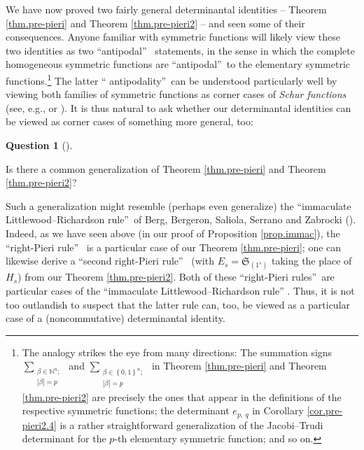 \documentclass
[numbers=enddot,12pt,final,onecolumn,notitlepage,english]{scrartcl}%
\theoremstyle{definition}
\newtheorem{quest}[theo]{Question}
\newenvironment{question}[1][]
{\begin{quest}[#1]\begin{leftbar}}
{\end{leftbar}\end{quest}}
\newenvironment{question}[1][Question]{\noindent\textbf{#1.} }{\ \rule{0.5em}{0.5em}}
\let\sumnonlimits\sum
\renewcommand{\sum}{\sumnonlimits\limits}
\begin{document}
We have now proved two fairly general determinantal identities -- Theorem
\ref{thm.pre-pieri} and Theorem \ref{thm.pre-pieri2} -- and seen some of their
consequences. Anyone familiar with symmetric functions will likely view these
two identities as two \textquotedblleft antipodal\textquotedblright%
\ statements, in the sense in which the complete homogeneous symmetric
functions are \textquotedblleft antipodal\textquotedblright\ to the elementary
symmetric functions.\footnote{The analogy strikes the eye from many
directions: The summation signs $\sum_{\substack{\beta\in\mathbb{N}%
^{n};\\\left\vert \beta\right\vert =p}}$ and $\sum_{\substack{\beta\in\left\{
0,1\right\}  ^{n};\\\left\vert \beta\right\vert =p}}$ in Theorem
\ref{thm.pre-pieri} and Theorem \ref{thm.pre-pieri2} are precisely the ones
that appear in the definitions of the respective symmetric functions; the
determinant $e_{p,\ q}$ in Corollary \ref{cor.pre-pieri2.4} is a rather
straightforward generalization of the Jacobi--Trudi determinant for the $p$-th
elementary symmetric function; and so on.} The latter \textquotedblleft
antipodality\textquotedblright\ can be understood particularly well by viewing
both families of symmetric functions as corner cases of \emph{Schur functions}
(see, e.g., \cite[Chapter 7]{Stanley-EC2} or \cite[\S I.3]{Macdon95}). It is
thus natural to ask whether our determinantal identities can be viewed as
corner cases of something more general, too:

\begin{question}
\label{quest.pre-LR}Is there a common generalization of Theorem
\ref{thm.pre-pieri} and Theorem \ref{thm.pre-pieri2}?
\end{question}

Such a generalization might resemble (perhaps even generalize) the
\textquotedblleft immaculate Littlewood--Richardson rule\textquotedblright\ of
Berg, Bergeron, Saliola, Serrano and Zabrocki (\cite[Theorem 7.3]{BBSSZ15}).
Indeed, as we have seen above (in our proof of Proposition \ref{prop.immac}),
the \textquotedblleft right-Pieri rule\textquotedblright\ \cite[Theorem
3.5]{BBSSZ13} is a particular case of our Theorem \ref{thm.pre-pieri}; one can
likewise derive a \textquotedblleft second right-Pieri rule\textquotedblright%
\ (with $E_{s}=\mathfrak{S}_{\left(  1^{s}\right)  }$ taking the place of
$H_{s}$) from our Theorem \ref{thm.pre-pieri2}. Both of these
\textquotedblleft right-Pieri rules\textquotedblright\ are particular cases of
the \textquotedblleft immaculate Littlewood--Richardson rule\textquotedblright%
. Thus, it is not too outlandish to suspect that the latter rule can, too, be
viewed as a particular case of a (noncommutative) determinantal identity.
\end{document}
